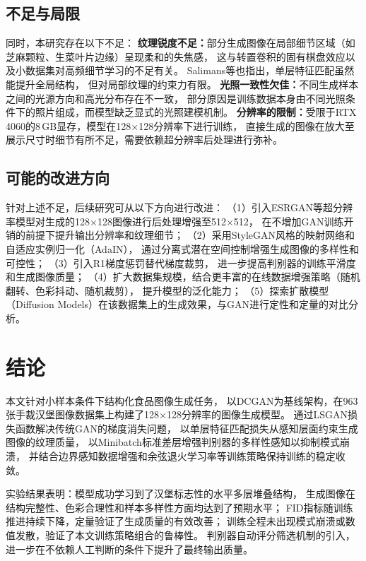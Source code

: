 \documentclass[12pt,a4paper]{ctexart}  %
\begin{document}
\subsection{不足与局限}

同时，本研究存在以下不足：
\textbf{纹理锐度不足：}部分生成图像在局部细节区域（如芝麻颗粒、生菜叶片边缘）呈现柔和的失焦感，
这与转置卷积的固有棋盘效应以及小数据集对高频细节学习的不足有关。
Salimans等\cite{salimans2016improved}也指出，单层特征匹配虽然能提升全局结构，
但对局部纹理的约束力有限。
\textbf{光照一致性欠佳：}不同生成样本之间的光源方向和高光分布存在不一致，
部分原因是训练数据本身由不同光照条件下的照片组成，而模型缺乏显式的光照建模机制。
\textbf{分辨率的限制：}受限于RTX 4060的8\,GB显存，模型在128×128分辨率下进行训练，
直接生成的图像在放大至展示尺寸时细节有所不足，需要依赖超分辨率后处理进行弥补。

\subsection{可能的改进方向}

针对上述不足，后续研究可从以下方向进行改进：
（1）引入ESRGAN等超分辨率模型\cite{wang2018esrgan}对生成的128×128图像进行后处理增强至512×512，
在不增加GAN训练开销的前提下提升输出分辨率和纹理细节；
（2）采用StyleGAN风格的映射网络和自适应实例归一化（AdaIN），
通过分离式潜在空间控制增强生成图像的多样性和可控性；
（3）引入R1梯度惩罚\cite{karras2018progressive}替代梯度裁剪，
进一步提高判别器的训练平滑度和生成图像质量；
（4）扩大数据集规模，结合更丰富的在线数据增强策略（随机翻转、色彩抖动、随机裁剪），
提升模型的泛化能力；
（5）探索扩散模型（Diffusion Models）在该数据集上的生成效果，与GAN进行定性和定量的对比分析。

\section{结论}

本文针对小样本条件下结构化食品图像生成任务，
以DCGAN为基线架构，在963张手裁汉堡图像数据集上构建了128×128分辨率的图像生成模型。
通过LSGAN损失函数解决传统GAN的梯度消失问题，
以单层特征匹配损失从感知层面约束生成图像的纹理质量，
以Minibatch标准差层增强判别器的多样性感知以抑制模式崩溃，
并结合边界感知数据增强和余弦退火学习率等训练策略保持训练的稳定收敛。

实验结果表明：模型成功学习到了汉堡标志性的水平多层堆叠结构，
生成图像在结构完整性、色彩合理性和样本多样性方面均达到了预期水平；
FID指标随训练推进持续下降，定量验证了生成质量的有效改善；
训练全程未出现模式崩溃或数值发散，验证了本文训练策略组合的鲁棒性。
判别器自动评分筛选机制的引入，进一步在不依赖人工判断的条件下提升了最终输出质量。
\end{document}
